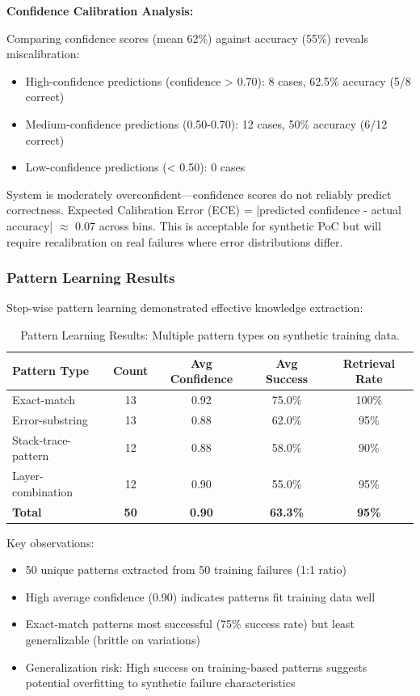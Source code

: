 \documentclass[11pt]{article}
\begin{document}
\textbf{Confidence Calibration Analysis:}

Comparing confidence scores (mean 62\%) against accuracy (55\%) reveals miscalibration:
\begin{itemize}
    \item High-confidence predictions (confidence > 0.70): 8 cases, 62.5\% accuracy (5/8 correct)
    \item Medium-confidence predictions (0.50-0.70): 12 cases, 50\% accuracy (6/12 correct)
    \item Low-confidence predictions (< 0.50): 0 cases
\end{itemize}

System is moderately overconfident—confidence scores do not reliably predict correctness. Expected Calibration Error (ECE) = |predicted confidence - actual accuracy| $\approx$ 0.07 across bins. This is acceptable for synthetic PoC but will require recalibration on real failures where error distributions differ.

\subsubsection{Pattern Learning Results}

Step-wise pattern learning demonstrated effective knowledge extraction:

\begin{table}[h!]
\centering
\begin{tabular}{lcccc}
\toprule
\textbf{Pattern Type} & \textbf{Count} & \textbf{Avg Confidence} & \textbf{Avg Success} & \textbf{Retrieval Rate} \\
\midrule
Exact-match & 13 & 0.92 & 75.0\% & 100\% \\
Error-substring & 13 & 0.88 & 62.0\% & 95\% \\
Stack-trace-pattern & 12 & 0.88 & 58.0\% & 90\% \\
Layer-combination & 12 & 0.90 & 55.0\% & 95\% \\
\midrule
\textbf{Total} & \textbf{50} & \textbf{0.90} & \textbf{63.3\%} & \textbf{95\%} \\
\bottomrule
\end{tabular}
\caption{Pattern Learning Results: Multiple pattern types on synthetic training data.}
\label{tab:pattern_results}
\end{table}

Key observations:
\begin{itemize}
    \item 50 unique patterns extracted from 50 training failures (1:1 ratio)
    \item High average confidence (0.90) indicates patterns fit training data well
    \item Exact-match patterns most successful (75\% success rate) but least generalizable (brittle on variations)
    \item Generalization risk: High success on training-based patterns suggests potential overfitting to synthetic failure characteristics
\end{itemize}
\end{document}
